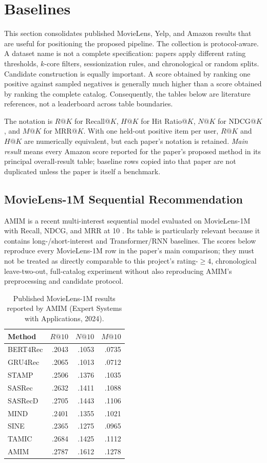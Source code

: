 \section{Baselines}
\label{sec:baselines}

This section consolidates published MovieLens, Yelp, and Amazon results that
are useful for positioning the proposed pipeline. The collection is
protocol-aware. A dataset name is not a complete specification: papers apply
different rating thresholds, $k$-core filters, sessionization rules, and
chronological or random splits. Candidate construction is equally important. A
score obtained by ranking one positive against sampled negatives is generally
much higher than a score obtained by ranking the complete catalog. Consequently,
the tables below are literature references, not a leaderboard across table
boundaries.

The notation is $R@K$ for Recall@$K$, $H@K$ for Hit Ratio@$K$, $N@K$ for
NDCG@$K$, and $M@K$ for MRR@$K$. With one held-out positive item per user,
$R@K$ and $H@K$ are numerically equivalent, but each paper's notation is
retained. \emph{Main result} means every Amazon score reported for the paper's
proposed method in its principal overall-result table; baseline rows copied
into that paper are not duplicated unless the paper is itself a benchmark.

\subsection{MovieLens-1M Sequential Recommendation}

AMIM is a recent multi-interest sequential model evaluated on MovieLens-1M
with Recall, NDCG, and MRR at 10 \cite{AMIM}. Its table is particularly relevant
because it contains long-/short-interest and Transformer/RNN baselines. The
scores below reproduce every MovieLens-1M row in the paper's main comparison;
they must not be treated as directly comparable to this project's
rating-$\geq4$, chronological leave-two-out, full-catalog experiment without
also reproducing AMIM's preprocessing and candidate protocol.

\begin{table}[H]
\centering
\caption{Published MovieLens-1M results reported by AMIM (Expert Systems with
Applications, 2024).}
\label{tab:amim-ml1m}
\begin{tabular}{@{}lrrr@{}}
\toprule
Method & $R@10$ & $N@10$ & $M@10$ \\
\midrule
BERT4Rec & .2043 & .1053 & .0735 \\
GRU4Rec & .2065 & .1013 & .0712 \\
STAMP & .2506 & .1376 & .1035 \\
SASRec & .2632 & .1411 & .1088 \\
SASRecD & .2705 & .1443 & .1106 \\
MIND & .2401 & .1355 & .1021 \\
SINE & .2365 & .1275 & .0965 \\
TAMIC & .2684 & .1425 & .1112 \\
AMIM & .2787 & .1612 & .1278 \\
\bottomrule
\end{tabular}
\end{table}

